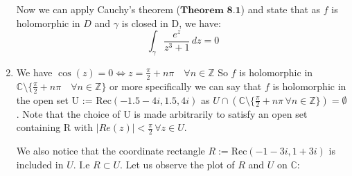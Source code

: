 \documentclass[12pt]{article}
\begin{document}
\begin{enumerate}[label=\textbf{(\roman*)}]

\noindent Now we can apply Cauchy's theorem (\(\textbf{Theorem 8.1}\)) and state that as \(f\) is holomorphic in \(D\) and \(\gamma \) is closed in D, we have:
\[\int_{\gamma} \frac{e^z}{z^3 + 1} \, dz = 0\]
\item We have \(\cos(z) = 0 \iff z = \frac{\pi}{2} + n\pi \quad \forall n \in \mathbb{Z}\)\newline
\linebreak
So \(f\) is holomorphic in \(\mathbb{C} \setminus \{\frac{\pi}{2} + n\pi \quad \forall n \in \mathbb{Z}\}\) or more specifically we can say that \(f\) is holomorphic in the open set U := \(\text{Rec}\left(-1.5-4i, 1.5, 4i\right)\) as \(U \cap \left(\mathbb{C} \setminus \{\frac{\pi}{2} + n\pi \, \forall n \in \mathbb{Z}\}\right) = \emptyset\). \newline
\linebreak
Note that the choice of U is made arbitrarily to satisfy an open set containing R with \(\left|Re(z)\right| < \frac{\pi}{2} \, \forall z \in U.\)

We also notice that the coordinate rectangle \(R := \text{Rec}(-1-3i,1+3i)\) is included in \(U\). I.e \(R \subset U\).\newline
\linebreak
Let us observe the plot of \(R\) and \(U\) on \(\mathbb{C}\):\newline
{}
\end{enumerate}
\end{document}

